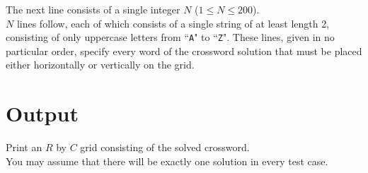 \noindent The next line consists of a single integer $N$ ($1 \leq N \leq 200$).\\

\noindent $N$ lines follow, each of which consists of a single string of at least length 2, consisting of only uppercase letters from ``\texttt{A}" to ``\texttt{Z}". These lines, given in no particular order, specify every word of the crossword solution that must be placed either horizontally or vertically on the grid.

\section*{Output}
Print an $R$ by $C$ grid consisting of the solved crossword.\\
You may assume that there will be exactly one solution in every test case.\\
